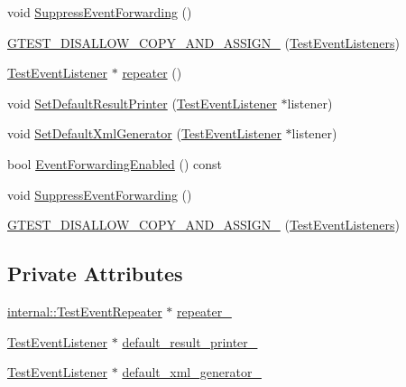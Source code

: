 \begin{DoxyCompactItemize}
\item 
void \mbox{\hyperlink{classtesting_1_1_test_event_listeners_a7132550dc1c50bb3399a6d6d3fc9be3d}{Suppress\+Event\+Forwarding}} ()
\item 
\mbox{\hyperlink{classtesting_1_1_test_event_listeners_a31d12292abc277dedbb7dc7748a6a60e}{G\+T\+E\+S\+T\+\_\+\+D\+I\+S\+A\+L\+L\+O\+W\+\_\+\+C\+O\+P\+Y\+\_\+\+A\+N\+D\+\_\+\+A\+S\+S\+I\+G\+N\+\_\+}} (\mbox{\hyperlink{classtesting_1_1_test_event_listeners}{Test\+Event\+Listeners}})
\item 
\mbox{\hyperlink{classtesting_1_1_test_event_listener}{Test\+Event\+Listener}} $\ast$ \mbox{\hyperlink{classtesting_1_1_test_event_listeners_a3de1e101514bdba3e74b93adc604e9c4}{repeater}} ()
\item 
void \mbox{\hyperlink{classtesting_1_1_test_event_listeners_aeaab55da7c18c35fb12c27c18ff99955}{Set\+Default\+Result\+Printer}} (\mbox{\hyperlink{classtesting_1_1_test_event_listener}{Test\+Event\+Listener}} $\ast$listener)
\item 
void \mbox{\hyperlink{classtesting_1_1_test_event_listeners_a36dbac47563ef8bb78cb467d11f5b4d9}{Set\+Default\+Xml\+Generator}} (\mbox{\hyperlink{classtesting_1_1_test_event_listener}{Test\+Event\+Listener}} $\ast$listener)
\item 
bool \mbox{\hyperlink{classtesting_1_1_test_event_listeners_aa1878baf16a50f30f6435fad3c68ef3f}{Event\+Forwarding\+Enabled}} () const
\item 
void \mbox{\hyperlink{classtesting_1_1_test_event_listeners_a7132550dc1c50bb3399a6d6d3fc9be3d}{Suppress\+Event\+Forwarding}} ()
\item 
\mbox{\hyperlink{classtesting_1_1_test_event_listeners_a31d12292abc277dedbb7dc7748a6a60e}{G\+T\+E\+S\+T\+\_\+\+D\+I\+S\+A\+L\+L\+O\+W\+\_\+\+C\+O\+P\+Y\+\_\+\+A\+N\+D\+\_\+\+A\+S\+S\+I\+G\+N\+\_\+}} (\mbox{\hyperlink{classtesting_1_1_test_event_listeners}{Test\+Event\+Listeners}})
\end{DoxyCompactItemize}
\subsection*{Private Attributes}
\begin{DoxyCompactItemize}
\item 
\mbox{\hyperlink{classtesting_1_1internal_1_1_test_event_repeater}{internal\+::\+Test\+Event\+Repeater}} $\ast$ \mbox{\hyperlink{classtesting_1_1_test_event_listeners_a9274e4ae281afd8467cf5a7623bd0eec}{repeater\+\_\+}}
\item 
\mbox{\hyperlink{classtesting_1_1_test_event_listener}{Test\+Event\+Listener}} $\ast$ \mbox{\hyperlink{classtesting_1_1_test_event_listeners_ad30c3a9be4ceb23eb5fa93a0572f0ad0}{default\+\_\+result\+\_\+printer\+\_\+}}
\item 
\mbox{\hyperlink{classtesting_1_1_test_event_listener}{Test\+Event\+Listener}} $\ast$ \mbox{\hyperlink{classtesting_1_1_test_event_listeners_a6708d609e34bc448b860a1241eb97d14}{default\+\_\+xml\+\_\+generator\+\_\+}}
\end{DoxyCompactItemize}
